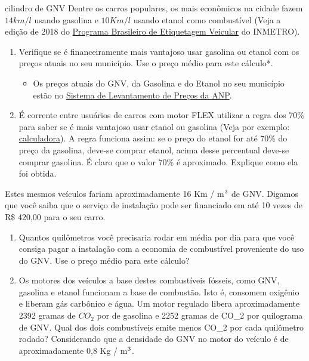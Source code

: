 \begin{task}{cilindro de GNV}
Dentre os carros populares, os mais econômicos na cidade fazem \(14 km / l\) usando gasolina e \(10 Km / l\) usando etanol como combustível (Veja a edição de 2018 do \href{http://www.inmetro.gov.br/consumidor/pbe/veiculos\_leves\_2018.pdf}{Programa Brasileiro de Etiquetagem Veicular} do INMETRO).
\begin{enumerate}
\item {} 
Verifique se é financeiramente mais vantajoso usar gasolina ou etanol com os preços atuais no seu município. Use o preço médio para este cálculo*.
\begin{itemize}
\item {} 
Os preços atuais do GNV, da Gasolina e do Etanol no seu município estão no \href{http://anp.gov.br/preco/prc/Resumo\_Por\_Municipio\_Index.asp}{Sistema de Levantamento de Preços da ANP}.

\end{itemize}

\item {} 
É corrente entre usuários de carros com motor FLEX utilizar a regra dos 70\% para saber se é mais vantajoso usar etanol ou gasolina (Veja por exemplo: \href{http://www.calculoexato.net/calculadora-flex-gasolina-x-alcool/}{calculadora}). A regra funciona assim: se o preço do etanol for até 70\% do preço da gasolina, deve-se comprar etanol, acima desse percentual deve-se comprar gasolina. É claro que o valor 70\% é aproximado. Explique como ela foi obtida.

\end{enumerate}

Estes mesmos veículos fariam aproximadamente 16 Km / m\(\sp{\text{3}}\) de GNV. Digamos que você saiba que o serviço de instalação pode ser financiado em até 10 vezes de R\$ 420,00 para o seu carro.
\begin{enumerate}
\item {} 
Quantos quilômetros você precisaria rodar em média por dia para que você consiga pagar a instalação com a economia de combustível proveniente do uso do GNV. Use o preço médio para este cálculo?

\item {} 
Os motores dos veículos a base destes combustíveis fósseis, como GNV, gasolina e etanol funcionam a base de combustão. Isto é, consomem oxigênio e liberam gás carbônico e água. Um motor regulado libera aproximadamente 2392 gramas de \(CO_2\) por de gasolina e 2252 gramas de CO\_2 por quilograma de GNV. Qual dos dois combustíveis emite menos CO\_2 por cada quilômetro rodado? Considerando que a densidade do GNV no motor do veículo é de aproximadamente 0,8 Kg / m\(\sp{\text{3}}\).

\end{enumerate}
\end{task}

